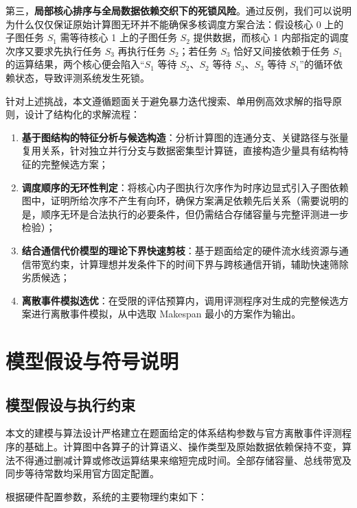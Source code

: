 \documentclass[anonymous,withtoc]{gmcm2026}
\providecommand{\tightlist}{\setlength{\itemsep}{0pt}\setlength{\parskip}{0pt}}
\begin{document}
第三，\textbf{局部核心排序与全局数据依赖交织下的死锁风险}。通过反例，我们可以说明为什么仅仅保证原始计算图无环并不能确保多核调度方案合法：假设核心 0 上的子图任务 \(S_1\) 需等待核心 1 上的子图任务 \(S_2\) 提供数据，而核心 1 内部指定的调度次序又要求先执行任务 \(S_3\) 再执行任务 \(S_2\)；若任务 \(S_3\) 恰好又间接依赖于任务 \(S_1\) 的运算结果，两个核心便会陷入``\(S_1\) 等待 \(S_2\)、\(S_2\) 等待 \(S_3\)、\(S_3\) 等待 \(S_1\)''的循环依赖状态，导致评测系统发生死锁。

针对上述挑战，本文遵循题面关于避免暴力迭代搜索、单用例高效求解的指导原则，设计了结构化的求解流程：

\begin{enumerate}
\def\labelenumi{\arabic{enumi}.}
\tightlist
\item
  \textbf{基于图结构的特征分析与候选构造}：分析计算图的连通分支、关键路径与张量复用关系，针对独立并行分支与数据密集型计算链，直接构造少量具有结构特征的完整候选方案；
\item
  \textbf{调度顺序的无环性判定}：将核心内子图执行次序作为时序边显式引入子图依赖图中，证明所给次序不产生有向环，确保方案满足依赖先后关系（需要说明的是，顺序无环是合法执行的必要条件，但仍需结合存储容量与完整评测进一步检验）；
\item
  \textbf{结合通信代价模型的理论下界快速剪枝}：基于题面给定的硬件流水线资源与通信带宽约束，计算理想并发条件下的时间下界与跨核通信开销，辅助快速筛除劣质候选；
\item
  \textbf{离散事件模拟选优}：在受限的评估预算内，调用评测程序对生成的完整候选方案进行离散事件模拟，从中选取 Makespan 最小的方案作为输出。
\end{enumerate}


\section{模型假设与符号说明}

\subsection{模型假设与执行约束}

本文的建模与算法设计严格建立在题面给定的体系结构参数与官方离散事件评测程序的基础上。计算图中各算子的计算语义、操作类型及原始数据依赖保持不变，算法不得通过删减计算或修改运算结果来缩短完成时间。全部存储容量、总线带宽及同步等待常数均采用官方固定配置\cite{ref1}。

根据硬件配置参数，系统的主要物理约束如下：
\end{document}

